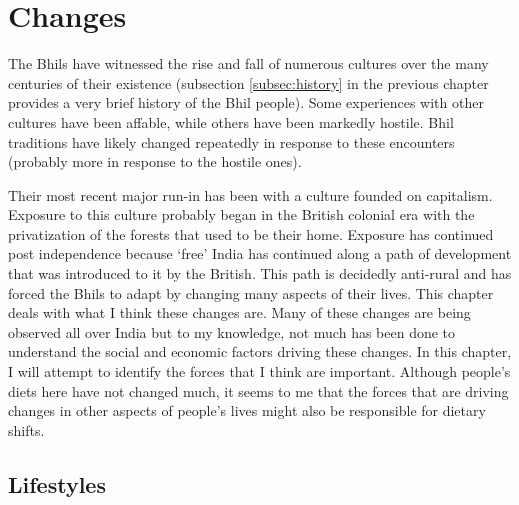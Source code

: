 \documentclass[report.tex]{subfiles}
\begin{document}
\chapter{Changes}

The Bhils have witnessed the rise and fall of numerous cultures over the many centuries of their existence (subsection \ref{subsec:history} in the previous chapter provides a very brief history of the Bhil people). Some experiences with other cultures have been affable, while others have been markedly hostile. Bhil traditions have likely changed repeatedly in response to these encounters (probably more in response to the hostile ones).

Their most recent major run-in has been with a culture founded on capitalism. Exposure to this culture probably began in the British colonial era with the privatization of the forests that used to be their home. Exposure has continued post independence because `free' India has continued along a path of development that was introduced to it by the British. This path is decidedly anti-rural and has forced the Bhils to adapt by changing many aspects of their lives. This chapter deals with what I think these changes are. Many of these changes are being observed all over India but to my knowledge, not much has been done to understand the social and economic factors driving these changes. In this chapter, I will attempt to identify the forces that I think are important. Although people's diets here have not changed much, it seems to me that the forces that are driving changes in other aspects of people's lives might also be responsible for dietary shifts.

\section{Lifestyles}\label{sec:lifestyles}
\end{document}
